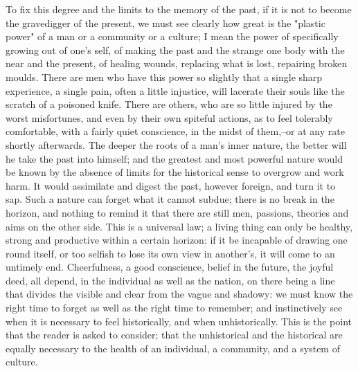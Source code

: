 To fix this degree and the limits to the memory of the past, if it is
not to become the gravedigger of the present, we must see clearly how
great is the "plastic power" of a man or a community or a culture; I
mean the power of specifically growing out of one's self, of making
the past and the strange one body with the near and the present, of
healing wounds, replacing what is lost, repairing broken moulds.
There are men who have this power so slightly that a single sharp
experience, a single pain, often a little injustice, will lacerate
their souls like the scratch of a poisoned knife. There are others,
who are so little injured by the worst misfortunes, and even by their
own spiteful actions, as to feel tolerably comfortable, with a fairly
quiet conscience, in the midst of them,--or at any rate shortly
afterwards. The deeper the roots of a man's inner nature, the better
will he take the past into himself; and the greatest and most
powerful nature would be known by the absence of limits for the
historical sense to overgrow and work harm. It would assimilate and
digest the past, however foreign, and turn it to sap. Such a nature
can forget what it cannot subdue; there is no break in the horizon,
and nothing to remind it that there are still men, passions, theories
and aims on the other side. This is a universal law; a living thing
can only be healthy, strong and productive within a certain horizon:
if it be incapable of drawing one round itself, or too selfish to
lose its own view in another's, it will come to an untimely end.
Cheerfulness, a good conscience, belief in the future, the joyful
deed, all depend, in the individual as well as the nation, on there
being a line that divides the visible and clear from the vague and
shadowy: we must know the right time to forget as well as the right
time to remember; and instinctively see when it is necessary to feel
historically, and when unhistorically. This is the point that the
reader is asked to consider; that the unhistorical and the historical
are equally necessary to the health of an individual, a community,
and a system of culture.

